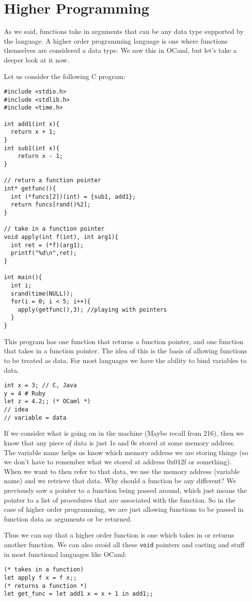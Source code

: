\documentclass[main.tex]{subfiles}
\begin{document}
\section{Higher Programming}
As we said, functions take in arguments that can be any data type supported by the language. A higher order programming language is one where functions themselves are considered a data type. We saw this in OCaml, but let's take a deeper look at it now. 

Let us consider the following C program:
\begin{lstlisting}[style=MyCstyle]
#include <stdio.h>
#include <stdlib.h>
#include <time.h>

int add1(int x){
  return x + 1;
}
int sub1(int x){
    return x - 1;
}

// return a function pointer
int* getfunc(){
  int (*funcs[2])(int) = {sub1, add1};
  return funcs[rand()%2];
}

// take in a function pointer
void apply(int f(int), int arg1){
  int ret = (*f)(arg1);
  printf("%d\n",ret);
}

int main(){
  int i;
  srand(time(NULL));
  for(i = 0; i < 5; i++){
    apply(getfunc(),3); //playing with pointers
  }
}

\end{lstlisting}
This program has one function that returns a function pointer, and one function that takes in a function pointer. 
The idea of this is the basis of allowing functions to be treated as data. 
For most languages we have the ability to bind variables to data. 
\begin{lstlisting}
int x = 3; // C, Java
y = 4 # Ruby
let z = 4.2;; (* OCaml *)
// idea
// variable = data
\end{lstlisting}
If we consider what is going on in the machine (Maybe recall from 216), then we know that any piece of data is just 1s and 0s stored at some memory address. The variable name helps us know which memory address we are storing things (so we don't have to remember what we stored at address 0x012f or something). 
When we want to then refer to that data, we use the memory address (variable name) and we retrieve that data. 
Why should a function be any different? 
We previously saw a pointer to a function being passed around, which just means the pointer to a list of procedures that are associated with the function. 
So in the case of higher order programming, we are just allowing functions to be passed in function data as arguments or be returned. 

Thus we can say that a higher order function is one which takes in or returns another function. We can also avoid all these \texttt{void} pointers and casting and stuff in most functional languages like OCaml:
\begin{lstlisting}[style=Myocamlstyle]
(* takes in a function)
let apply f x = f x;;
(* returns a function *)
let get_func = let add1 x = x + 1 in add1;;
\end{lstlisting}
\end{document}
